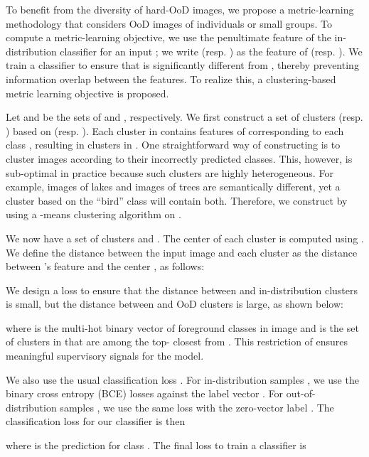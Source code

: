 \documentclass[10pt,twocolumn,letterpaper]{article}
\begin{document}
To benefit from the diversity of hard-OoD images, we propose a metric-learning methodology that considers OoD images of individuals or small groups.
To compute a metric-learning objective, we use the penultimate feature  of the in-distribution classifier  for an input ; we write  (resp. ) as the feature of  (resp. ).
We train a classifier  to ensure that  is significantly different from , thereby preventing information overlap between the features.
To realize this, a clustering-based metric learning objective is proposed. 


 
Let  and  be the sets of  and , respectively.
We first construct a set of clusters  (resp. ) based on  (resp. ). 
Each cluster in  contains features of  corresponding to each class , resulting in  clusters in .
One straightforward way of constructing  is to cluster images according to their incorrectly predicted classes.
This, however, is sub-optimal in practice because such clusters are highly heterogeneous. For example, images of lakes and images of trees are semantically different, yet a cluster based on the ``bird'' class will contain both. 
Therefore, we construct  by using a -means clustering algorithm on .









We now have a set of clusters  and .
The center of each cluster is computed using .
We define the distance between the input image  and each cluster  as the distance between 's feature  and the center , as follows:

We design a loss  to ensure that the distance between  and in-distribution clusters  is small, but the distance between  and OoD clusters  is large, as shown below:

where  is the multi-hot binary vector of foreground classes in image  and  is the set of clusters in 
that are among the top- closest from  . This restriction of  ensures meaningful supervisory signals for the model.






We also use the usual classification loss . For in-distribution samples , we use the binary cross entropy (BCE) losses against the label vector . For out-of-distribution samples , we use the same loss with the zero-vector label .
The classification loss for our classifier  is then

where  is the prediction for class .
The final loss  to train a classifier  is
\end{document}
